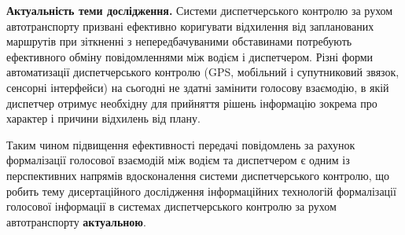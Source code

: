 \textbf{Актуальність теми дослідження.} 
Системи диспетчерського контролю за рухом автотранспорту призвані ефективно коригувати відхилення від запланованих маршрутів при зіткненні з непередбачуваними обставинами потребують ефективного обміну повідомленнями між водієм і диспетчером. Різні форми автоматизації диспетчерського контролю (GPS, мобільний і супутниковий звязок, сенсорні інтерфейси) на сьогодні не здатні замінити голосову взаємодію, в якій диспетчер отримує необхідну для прийняття рішень інформацію зокрема про характер і причини відхилень від плану. 

Таким чином підвищення ефективності передачі повідомлень за рахунок формалізації голосової взаємодій між водієм та диспетчером є одним із перспективних напрямів вдосконалення системи диспетчерського контролю, що робить тему дисертаційного дослідження інформаційних технологій формалізації голосової інформації в системах диспетчерського контролю за рухом автотранспорту \textbf{актуальною}.

